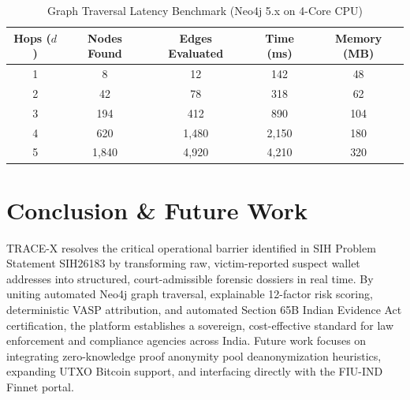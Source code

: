 \documentclass[10pt,twocolumn,a4paper]{article}
\begin{document}
\begin{table}[h]
\centering
\small
\caption{Graph Traversal Latency Benchmark (Neo4j 5.x on 4-Core CPU)}
\label{tab:perf}
\begin{tabularx}{\columnwidth}{ccccc}
\toprule
\textbf{Hops ($d$)} & \textbf{Nodes Found} & \textbf{Edges Evaluated} & \textbf{Time (ms)} & \textbf{Memory (MB)} \\
\midrule
1 & 8 & 12 & 142 & 48 \\
2 & 42 & 78 & 318 & 62 \\
3 & 194 & 412 & 890 & 104 \\
4 & 620 & 1,480 & 2,150 & 180 \\
5 & 1,840 & 4,920 & 4,210 & 320 \\
\bottomrule
\end{tabularx}
\end{table}

\section{Conclusion \& Future Work}
TRACE-X resolves the critical operational barrier identified in SIH Problem Statement SIH26183 by transforming raw, victim-reported suspect wallet addresses into structured, court-admissible forensic dossiers in real time. By uniting automated Neo4j graph traversal, explainable 12-factor risk scoring, deterministic VASP attribution, and automated Section 65B Indian Evidence Act certification, the platform establishes a sovereign, cost-effective standard for law enforcement and compliance agencies across India. Future work focuses on integrating zero-knowledge proof anonymity pool deanonymization heuristics, expanding UTXO Bitcoin support, and interfacing directly with the FIU-IND Finnet portal.



\end{document}
